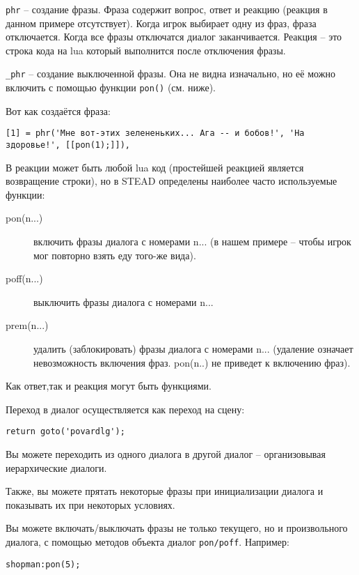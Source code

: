 \documentclass[a4paper,12pt]{article}
\begin{document}
\verb/phr/ -- создание фразы. Фраза содержит вопрос, ответ и реакцию (реакция в данном примере отсутствует). Когда игрок выбирает одну из фраз, фраза отключается. Когда все фразы отключатся диалог заканчивается. Реакция -- это строка кода на lua который выполнится после отключения фразы. 

\verb/_phr/ -- создание выключенной фразы. Она не видна изначально, но её можно включить с помощью функции \verb/pon()/ (см. ниже).

Вот как создаётся фраза:

\begin{verbatim}
[1] = phr('Мне вот-этих зелененьких... Ага -- и бобов!', 'На здоровье!', [[pon(1);]]),
\end{verbatim}

В реакции может быть любой lua код (простейшей реакцией является возвращение строки), но в STEAD определены наиболее часто используемые функции:

\begin{description}
\item[pon(n...)] включить фразы диалога с номерами n... (в нашем примере -- чтобы игрок мог повторно взять еду того-же вида).
\item[poff(n...)] выключить фразы диалога с номерами n...
\item[prem(n...)] удалить (заблокировать) фразы диалога с номерами n... (удаление означает невозможность включения фраз. pon(n..) не приведет к включению фраз).
\end{description}

Как ответ,так и реакция могут быть функциями.

Переход в диалог осуществляется как переход на сцену:

\begin{verbatim}
return goto('povardlg');
\end{verbatim}

Вы можете переходить из одного диалога в другой диалог -- организовывая иерархические диалоги.

Также, вы можете прятать некоторые фразы при инициализации диалога и показывать их при некоторых условиях.

Вы можете включать/выключать фразы не только текущего, но и произвольного диалога, с помощью методов объекта диалог \verb,pon/poff,. Например:

\begin{verbatim}
shopman:pon(5);
\end{verbatim}
\end{document}
